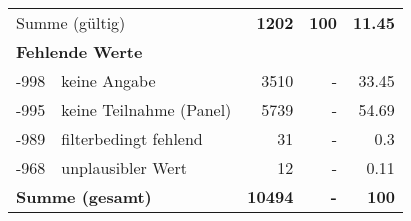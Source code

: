 \begin{longtable}{lXrrr}
     \midrule
     \multicolumn{2}{l}{Summe (gültig)} &
       \textbf{\num{1202}} &
     \textbf{\num{100}} &
       \textbf{\num[round-mode=places,round-precision=2]{11.45}} \\
     \multicolumn{5}{l}{\textbf{Fehlende Werte}}\\
       -998 &
       keine Angabe &
         \num{3510} &
        - &
         \num[round-mode=places,round-precision=2]{33.45} \\
       -995 &
       keine Teilnahme (Panel) &
         \num{5739} &
        - &
         \num[round-mode=places,round-precision=2]{54.69} \\
       -989 &
       filterbedingt fehlend &
         \num{31} &
        - &
         \num[round-mode=places,round-precision=2]{0.3} \\
       -968 &
       unplausibler Wert &
         \num{12} &
        - &
         \num[round-mode=places,round-precision=2]{0.11} \\
     \midrule
     \multicolumn{2}{l}{\textbf{Summe (gesamt)}} &
          \textbf{\num{10494}} &
        \textbf{-} &
        \textbf{\num{100}} \\
     \bottomrule
     \end{longtable}
     
